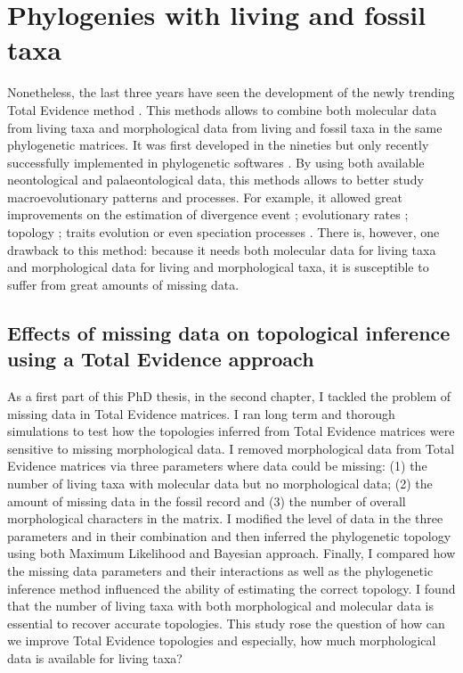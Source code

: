 \section{Phylogenies with living and fossil taxa}
Nonetheless, the last three years have seen the development of the newly trending Total Evidence method \citep{ronquista2012,slaterphylogenetic2013,Wood01032013,schragocombining2013,beckancient2014,Arcila2015131,Dembo2015}.
This methods allows to combine both molecular data from living taxa and morphological data from living and fossil taxa in the same phylogenetic matrices.
It was first developed in the nineties \citep{eernissetaxonomic1993} but only recently successfully implemented in phylogenetic softwares \citep{Ronquist2012mrbayes,BEAST2}.
By using both available neontological and palaeontological data, this methods allows to better study macroevolutionary patterns and processes.
For example, it allowed great improvements on the estimation of divergence event \citep[e.g.][]{ronquista2012}; evolutionary rates \citep[e.g.][]{beckancient2014}; topology \citep[e.g.][]{Dembo2015}; traits evolution \citep[e.g.][]{slaterphylogenetic2013} or even speciation processes \citep[e.g.][]{Wood01032013}.
There is, however, one drawback to this method: because it needs both molecular data for living taxa and morphological data for living and morphological taxa, it is susceptible to suffer from great amounts of missing data.

\subsection{Effects of missing data on topological inference using a Total Evidence approach}
As a first part of this PhD thesis, in the second chapter, I tackled the problem of missing data in Total Evidence matrices.
I ran long term and thorough simulations to test how the topologies inferred from Total Evidence matrices were sensitive to missing morphological data.
I removed morphological data from Total Evidence matrices via three parameters where data could be missing: (1) the number of living taxa with molecular data but no morphological data; (2) the amount of missing data in the fossil record and (3) the number of overall morphological characters in the matrix.
I modified the level of data in the three parameters and in their combination and then inferred the phylogenetic topology using both Maximum Likelihood and Bayesian approach.
Finally, I compared how the missing data parameters and their interactions as well as the phylogenetic inference method influenced the ability of estimating the correct topology.
I found that the number of living taxa with both morphological and molecular data is essential to recover accurate topologies.
This study rose the question of how can we improve Total Evidence topologies and especially, how much morphological data is available for living taxa?

